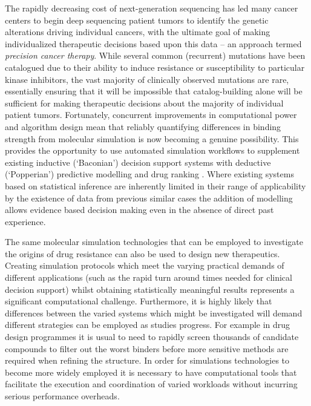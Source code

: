 The rapidly decreasing cost of next-generation sequencing has led many cancer centers to begin deep sequencing patient tumors to identify the genetic alterations driving individual cancers, with the ultimate goal of making individualized therapeutic decisions based upon this data -- an approach termed \textit{precision cancer therapy}.
While several common (recurrent) mutations have been catalogued due to their ability to induce resistance or susceptibility to particular kinase inhibitors, the vast majority of clinically observed mutations are rare, essentially ensuring that it will be impossible that catalog-building alone will be sufficient for making therapeutic decisions about the majority of individual patient tumors.
Fortunately, concurrent improvements in computational power and algorithm design mean that reliably quantifying differences in binding strength from molecular simulation is now becoming a genuine possibility.
This provides the opportunity to use automated simulation workflows to supplement existing inductive (`Baconian') decision support systems with deductive (`Popperian') predictive modelling and drug ranking \cite{Marias2011, Sloot2009}.
Where existing systems based on statistical inference are inherently limited in their range of applicability by the existence of data from previous similar cases the addition of modelling allows evidence based decision making even in the absence of direct past experience.

The same molecular simulation technologies that can be employed to investigate
the origins of drug resistance can also be used to design new therapeutics.
Creating simulation protocols which meet the varying practical demands of
different applications (such as the rapid turn around times needed for
clinical decision support) whilst obtaining statistically meaningful results
represents a significant computational challenge. Furthermore, it is highly
likely that differences between the varied systems which might be investigated
will demand different strategies can be employed as studies progress. For
example in drug design programmes it is usual to need to rapidly screen
thousands of candidate compounds to filter out the worst binders before more
sensitive methods are required when refining the structure. In order for
simulations technologies to become more widely employed it is necessary to
have computational tools that facilitate the execution and coordination of
varied workloads without incurring serious performance overheads.


